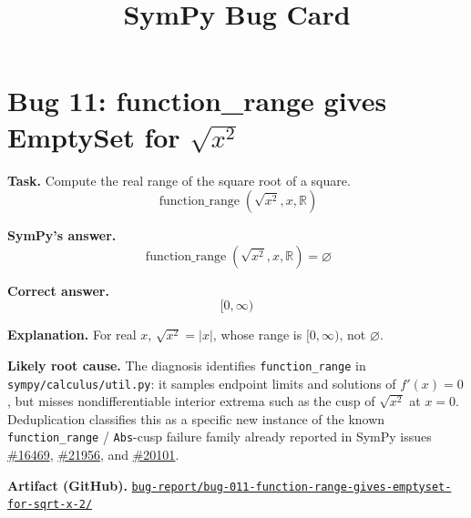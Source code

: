 \documentclass[11pt]{article}
\title{SymPy Bug Card}
\author{}
\date{}
\newcommand{\SymPy}{SymPy}
\newcommand{\artifactrepo}{https://github.com/TODO-org/TODO-repo}
\newcommand{\bugbundle}[1]{\href{\artifactrepo/tree/main/bug-report/#1}{\nolinkurl{bug-report/#1/}}}
\begin{document}
\maketitle

\section*{Bug 11: function\_range gives EmptySet for \texorpdfstring{$\sqrt{x^2}$}{sqrt(x**2)}}

\begin{counterexamplebox}
\textbf{Task.} Compute the real range of the square root of a square.
\[
  \operatorname{function\_range}\!\left(\sqrt{x^2}, x, \mathbb{R}\right)
\]

\medskip
\textbf{SymPy's answer.}
\[
  \operatorname{function\_range}\!\left(\sqrt{x^2}, x, \mathbb{R}\right)=\varnothing
\]

\medskip
\textbf{Correct answer.}
\[
  [0,\infty)
\]

\medskip
\textbf{Explanation.} For real \(x\), \(\sqrt{x^2}=|x|\), whose range is
\([0,\infty)\), not \(\varnothing\).

\medskip
\textbf{Likely root cause.} The diagnosis identifies
\texttt{function\_range} in \nolinkurl{sympy/calculus/util.py}: it samples
endpoint limits and solutions of \(f'(x)=0\), but misses nondifferentiable
interior extrema such as the cusp of \(\sqrt{x^2}\) at \(x=0\). Deduplication
classifies this as a specific new instance of the known
\texttt{function\_range} / \texttt{Abs}-cusp failure family already reported in
\SymPy{} issues
\href{https://github.com/sympy/sympy/issues/16469}{\#16469},
\href{https://github.com/sympy/sympy/issues/21956}{\#21956}, and
\href{https://github.com/sympy/sympy/issues/20101}{\#20101}.

\medskip
\textbf{Artifact (GitHub).} \bugbundle{bug-011-function-range-gives-emptyset-for-sqrt-x-2}
\end{counterexamplebox}
\end{document}
